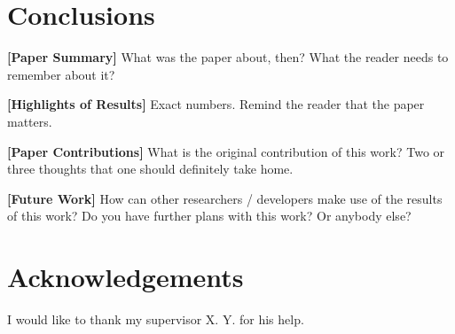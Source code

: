 \section{Conclusions}
\label{sec:Conclusions}

\textbf{[Paper Summary]} What was the paper about, then? What the reader needs to remember about it?

\textbf{[Highlights of Results]} Exact numbers. Remind the reader that the paper matters.

\textbf{[Paper Contributions]} What is the original contribution of this work? Two or three thoughts that one should definitely take home.

\textbf{[Future Work]} How can other researchers / developers make use of the results of this work?  Do you have further plans with this work? Or anybody else?

\section*{Acknowledgements}
I would like to thank my supervisor X. Y. for his help.